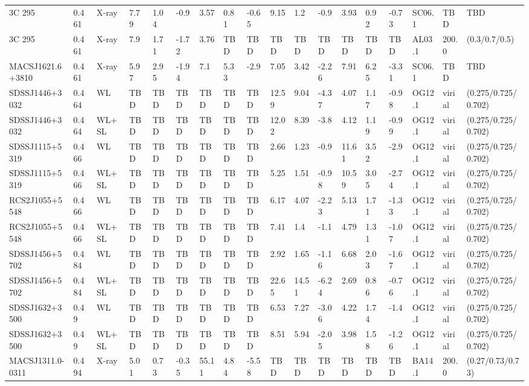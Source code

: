 \documentclass{article}
\begin{document}
\begin{center}
\begin{landscape}
\begin{longtable}{llllllllllllllllll}
3C 295 & 0.461 & X-ray & 7.79 & 1.04 & -0.9 & 3.57 & 0.81 & -0.65 & 9.15 & 1.2 & -0.9 & 3.93 & 0.92 & -0.73 & SC06.1 & TBD & TBD \\
3C 295 & 0.461 & X-ray & 7.9 & 1.71 & -1.72 & 3.76 & TBD & TBD & TBD & TBD & TBD & TBD & TBD & TBD & AL03.1 & 200.0 & (0.3/0.7/0.5) \\
MACSJ1621.6+3810 & 0.461 & X-ray & 5.97 & 2.95 & -1.94 & 7.1 & 5.33 & -2.9 & 7.05 & 3.42 & -2.26 & 7.91 & 6.25 & -3.31 & SC06.1 & TBD & TBD \\
SDSSJ1446+3032 & 0.464 & WL & TBD & TBD & TBD & TBD & TBD & TBD & 12.59 & 9.04 & -4.37 & 4.07 & 1.17 & -0.98 & OG12.1 & virial & (0.275/0.725/0.702) \\
SDSSJ1446+3032 & 0.464 & WL+SL & TBD & TBD & TBD & TBD & TBD & TBD & 12.02 & 8.39 & -3.8 & 4.12 & 1.19 & -0.99 & OG12.1 & virial & (0.275/0.725/0.702) \\
SDSSJ1115+5319 & 0.466 & WL & TBD & TBD & TBD & TBD & TBD & TBD & 2.66 & 1.23 & -0.9 & 11.61 & 3.52 & -2.9 & OG12.1 & virial & (0.275/0.725/0.702) \\
SDSSJ1115+5319 & 0.466 & WL+SL & TBD & TBD & TBD & TBD & TBD & TBD & 5.25 & 1.51 & -0.98 & 10.59 & 3.05 & -2.74 & OG12.1 & virial & (0.275/0.725/0.702) \\
RCS2J1055+5548 & 0.466 & WL & TBD & TBD & TBD & TBD & TBD & TBD & 6.17 & 4.07 & -2.23 & 5.13 & 1.71 & -1.33 & OG12.1 & virial & (0.275/0.725/0.702) \\
RCS2J1055+5548 & 0.466 & WL+SL & TBD & TBD & TBD & TBD & TBD & TBD & 7.41 & 1.4 & -1.1 & 4.79 & 1.31 & -1.07 & OG12.1 & virial & (0.275/0.725/0.702) \\
SDSSJ1456+5702 & 0.484 & WL & TBD & TBD & TBD & TBD & TBD & TBD & 2.92 & 1.65 & -1.16 & 6.68 & 2.03 & -1.67 & OG12.1 & virial & (0.275/0.725/0.702) \\
SDSSJ1456+5702 & 0.484 & WL+SL & TBD & TBD & TBD & TBD & TBD & TBD & 22.65 & 14.51 & -6.24 & 2.69 & 0.86 & -0.76 & OG12.1 & virial & (0.275/0.725/0.702) \\
SDSSJ1632+3500 & 0.49 & WL & TBD & TBD & TBD & TBD & TBD & TBD & 6.53 & 7.27 & -3.06 & 4.22 & 1.74 & -1.4 & OG12.1 & virial & (0.275/0.725/0.702) \\
SDSSJ1632+3500 & 0.49 & WL+SL & TBD & TBD & TBD & TBD & TBD & TBD & 8.51 & 5.94 & -2.05 & 3.98 & 1.58 & -1.26 & OG12.1 & virial & (0.275/0.725/0.702) \\
MACSJ1311.0-0311 & 0.494 & X-ray & 5.01 & 0.73 & -0.35 & 55.11 & 4.84 & -5.58 & TBD & TBD & TBD & TBD & TBD & TBD & BA14.1 & 200.0 & (0.27/0.73/0.73) \\

\end{longtable}
\end{landscape}
\end{center}
\end{document}
